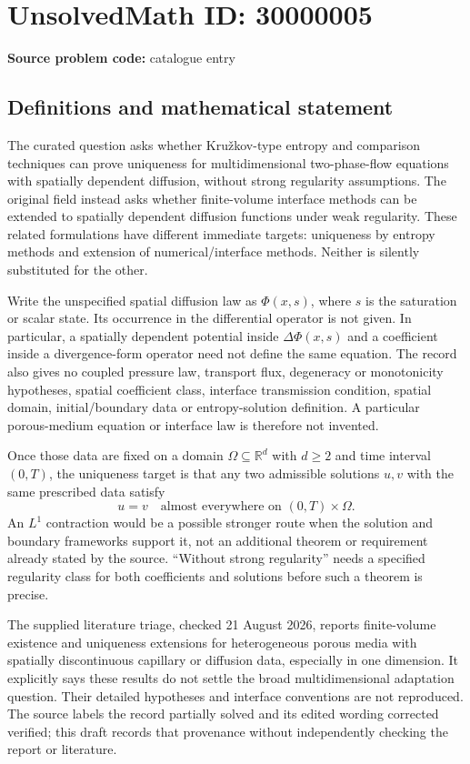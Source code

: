 \documentclass[11pt]{article}
\newcommand{\R}{\mathbb{R}}
\begin{document}
\section*{UnsolvedMath ID: 30000005}
\textbf{Source problem code:} catalogue entry
\subsection{Definitions and mathematical statement}
The curated question asks whether Kru\v{z}kov-type entropy and comparison techniques can prove uniqueness for multidimensional two-phase-flow equations with spatially dependent diffusion, without strong regularity assumptions. The original field instead asks whether finite-volume interface methods can be extended to spatially dependent diffusion functions under weak regularity. These related formulations have different immediate targets: uniqueness by entropy methods and extension of numerical/interface methods. Neither is silently substituted for the other.

Write the unspecified spatial diffusion law as $\Phi(x,s)$, where $s$ is the saturation or scalar state. Its occurrence in the differential operator is not given. In particular, a spatially dependent potential inside $\Delta\Phi(x,s)$ and a coefficient inside a divergence-form operator need not define the same equation. The record also gives no coupled pressure law, transport flux, degeneracy or monotonicity hypotheses, spatial coefficient class, interface transmission condition, spatial domain, initial/boundary data or entropy-solution definition. A particular porous-medium equation or interface law is therefore not invented.

Once those data are fixed on a domain $\Omega\subseteq\R^d$ with $d\geq2$ and time interval $(0,T)$, the uniqueness target is that any two admissible solutions $u,v$ with the same prescribed data satisfy
\[
 u=v\quad\text{almost everywhere on }(0,T)\times\Omega.
\]
An $L^1$ contraction would be a possible stronger route when the solution and boundary frameworks support it, not an additional theorem or requirement already stated by the source. ``Without strong regularity'' needs a specified regularity class for both coefficients and solutions before such a theorem is precise.

The supplied literature triage, checked 21 August 2026, reports finite-volume existence and uniqueness extensions for heterogeneous porous media with spatially discontinuous capillary or diffusion data, especially in one dimension. It explicitly says these results do not settle the broad multidimensional adaptation question. Their detailed hypotheses and interface conventions are not reproduced. The source labels the record partially solved and its edited wording corrected verified; this draft records that provenance without independently checking the report or literature.
\end{document}
